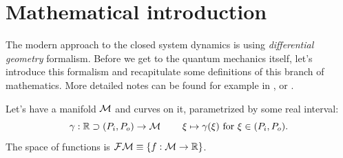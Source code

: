 \chapter{Mathematical introduction}
\label{chap:mathIntro}
The modern approach to the closed system dynamics is using \emph{differential geometry} formalism. Before we get to the quantum mechanics itself, let's introduce this formalism and recapitulate some definitions of this branch of mathematics. More detailed notes can be found for example in \cite{lu}, or \cite{fecko}.

Let's have a manifold $\mathcal{M}$ and curves on it, parametrized by some real interval:
$$\gamma:\mathbb{R} \supset (P_i,P_o) \rightarrow \mathcal{M}\; \qquad \xi\mapsto \gamma(\xi) \text{  for } \xi \in (P_i,P_o) .$$ 
The space of functions is $\mathcal{FM}\equiv\{f:\mathcal{M}\rightarrow \mathbb{R}\}$.


